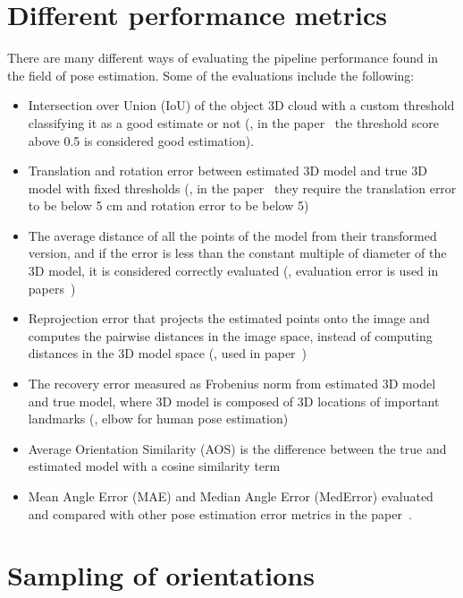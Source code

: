 \clearpage

\section{Different performance metrics}\label{apx:metrics-review}


There are many different ways of evaluating the pipeline performance found in the field of pose estimation. Some of the evaluations include the following:
\begin{itemize}
\item Intersection over Union (IoU) of the object 3D cloud with a custom threshold classifying it as a good estimate or not (\eg, in the paper~\cite{10.1007/s11263-014-0733-5} the threshold score above 0.5 is considered good estimation).
\item Translation and rotation error between estimated 3D model and true 3D model with fixed thresholds (\eg, in the paper~\cite{shotton2013scene} they require the translation error to be below 5 cm and rotation error to be below 5\degree)
\item The average distance of all the points of the model from their transformed version, and if the error is less than the constant multiple of diameter of the 3D model, it is considered correctly evaluated (\eg, evaluation error is used in papers~\cite{10.1007/978-3-642-37331-2_42, xiang2018posecnn})
\item Reprojection error that projects the estimated points onto the image and computes the pairwise distances in the image space, instead of computing distances in the 3D model space (\eg, used in paper~\cite{xiang2018posecnn})
\item The recovery error measured as Frobenius norm from estimated 3D model and true model, where 3D model is composed of 3D locations of important landmarks (\eg, elbow for human pose estimation)~\cite{wangni2018monocular}
\item Average Orientation Similarity (AOS) is the difference between the true and estimated model with a cosine similarity term~\cite{RedondoCabrera2016PoseEE}
\item Mean Angle Error (MAE) and Median Angle Error (MedError) evaluated and compared with other pose estimation error metrics in the paper~\cite{RedondoCabrera2016PoseEE}.
\end{itemize}

\section{Sampling of orientations}\label{apx:orientation-sampling}

